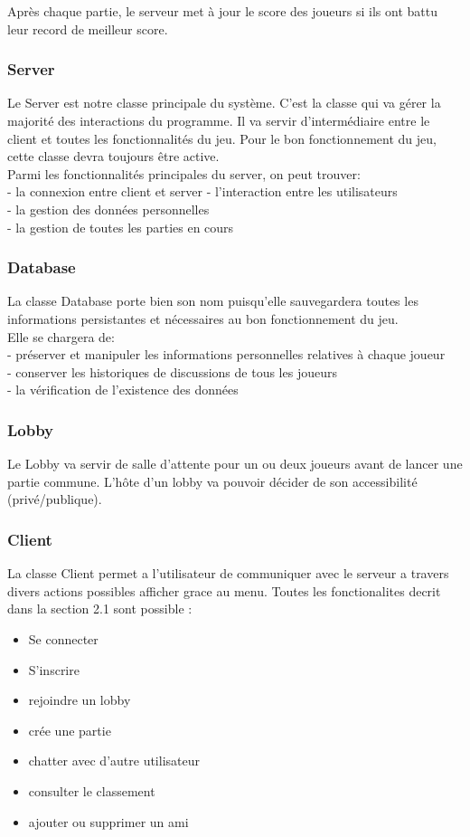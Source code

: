 \documentclass[a4paper,12pt]{article}
\begin{document}
Après chaque partie, le serveur met à jour le score des joueurs si ils ont battu leur record de meilleur score.


\subsubsection{Server}
Le Server est notre classe principale du système. C'est la classe qui va gérer la majorité des interactions du programme. Il va servir d'intermédiaire entre le client et toutes les fonctionnalités du jeu. Pour le bon fonctionnement du jeu, cette classe devra toujours être active.\\
Parmi les fonctionnalités principales du server, on peut trouver:\\
- la connexion entre client et server
- l'interaction entre les utilisateurs\\
- la gestion des données personnelles\\
- la gestion de toutes les parties en cours
\subsubsection{Database}
La classe Database porte bien son nom puisqu'elle sauvegardera toutes les informations persistantes et nécessaires au bon fonctionnement du jeu.\\
Elle se chargera de:\\
- préserver et manipuler les informations personnelles relatives à chaque joueur\\
- conserver les historiques de discussions de tous les joueurs\\
- la vérification de l'existence des données
\subsubsection{Lobby}
Le Lobby va servir de salle d'attente pour un ou deux joueurs avant de lancer une partie commune. L'hôte d'un lobby va pouvoir décider de son accessibilité (privé/publique).

\subsubsection{Client}
La classe Client permet a l'utilisateur de communiquer avec le serveur a travers divers actions possibles afficher grace au menu.
Toutes les fonctionalites decrit dans la section 2.1 sont possible :
\begin{itemize}
    \item Se connecter
    \item S'inscrire
    \item rejoindre un lobby
    \item crée une partie
    \item chatter avec d'autre utilisateur
    \item consulter le classement
    \item ajouter ou supprimer un ami
\end{itemize}
\end{document}
